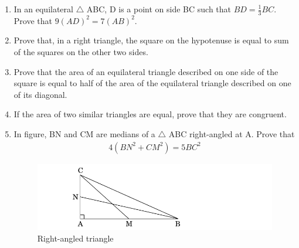 \begin{enumerate}
	\item In an equilateral $\triangle$ ABC, D is a point on side BC such that $ BD =\frac{1}{3}BC$. Prove that $9(AD)^2 = 7(AB)^2$.
	\hfill{}\item Prove that, in a right triangle, the  square on the hypotenuse is equal to sum of the squares on the other two sides.
	\hfill{}\item Prove that the area of an equilateral triangle described on one side of the square is equal to half of the area of the equilateral triangle described on one of its diagonal.
	\hfill{}\item If the area of two similar triangles are equal, prove that they are congruent.
\hfill{}
\item In figure, BN and CM are medians of a $\triangle$ ABC right-angled at A. Prove that \begin{align}4(BN^2 +CM^2) = 5BC^2\end{align} 
\begin{figure}[!ht]
\centering
\includegraphics[width=\columnwidth]{cbse-math/figs/rightangled}
\caption{Right-angled triangle}
\label{fig:rightangled4}
\end{figure}


\end{enumerate}
